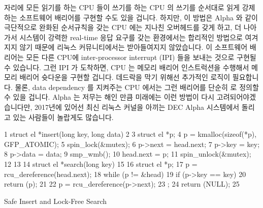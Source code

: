  자리에 모든 읽기를 하는 CPU 들이 쓰기를 하는 CPU 의 쓰기를
순서대로 읽게 강제하는 소프트웨어 배리어를 구현할 수도 있을 겁니다.
하지만, 이 방법은 Alpha 와 같이 극단적으로 완화된 순서규칙을 갖는 CPU 에는
지나친 오버헤드를 갖게 하고, 더 나아가서 시스템이 강력한 real-time 응답 요구를
갖는 환경에서는 합리적인 방법으로 여겨지지 않기 때문에 리눅스 커뮤니티에서는
받아들여지지 않았습니다.
이 소프트웨어 배리어는 모든 다른 CPU에 inter-processor interrupt (IPI) 들을
보내는 것으로 구현될 수 있습니다.
그런 IPI 가 도착하면, CPU 는 메모리 배리어 인스트럭션을 수행해서 메모리 배리어
슛다운을 구현할 겁니다.
데드락을 막기 위해선 추가적인 로직이 필요합니다.
물론, data dependency 를 지켜주는 CPU 에서는 그런 배리어를 단순히
 로 정의할 수 있을 겁니다.
Alpha 는 저무는 해인 만큼 미래에는 이런 방법이 다시 고려되어야겠습니다만,
2017년에 있어선 최신 리눅스 커널을 아끼는 DEC Alpha 시스템에서 돌리고 있는
사람들이 놀랍게도 많습니다.

\begin{listing}[tbp]
{ \scriptsize
\begin{verbbox}
 1  struct el *insert(long key, long data)
 2  {
 3      struct el *p;
 4      p = kmalloc(sizeof(*p), GFP_ATOMIC);
 5      spin_lock(&mutex);
 6      p->next = head.next;
 7      p->key = key;
 8      p->data = data;
 9      smp_wmb();
10      head.next = p;
11      spin_unlock(&mutex);
12  }
13
14  struct el *search(long key)
15  {
16      struct el *p;
17      p = rcu_dereference(head.next);
18      while (p != &head) {
19          if (p->key == key) {
20              return (p);
21          }
22          p = rcu_dereference(p->next);
23      };
24      return (NULL);
25  }
\end{verbbox}
}
\centering
\theverbbox
\caption{Safe Insert and Lock-Free Search}
\label{lst:memorder:Safe Insert and Lock-Free Search}
\end{listing}

